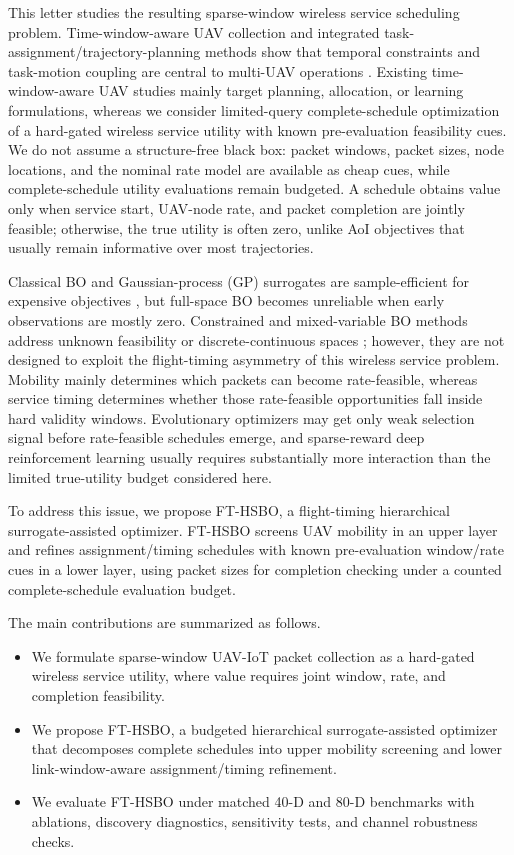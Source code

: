 \documentclass[letterpaper,journal]{IEEEtran}
\begin{document}
This letter studies the resulting sparse-window wireless service scheduling problem. Time-window-aware UAV collection and integrated task-assignment/trajectory-planning methods show that temporal constraints and task-motion coupling are central to multi-UAV operations \cite{say2021,wu2025}. Existing time-window-aware UAV studies mainly target planning, allocation, or learning formulations, whereas we consider limited-query complete-schedule optimization of a hard-gated wireless service utility with known pre-evaluation feasibility cues. We do not assume a structure-free black box: packet windows, packet sizes, node locations, and the nominal rate model are available as cheap cues, while complete-schedule utility evaluations remain budgeted. A schedule obtains value only when service start, UAV-node rate, and packet completion are jointly feasible; otherwise, the true utility is often zero, unlike AoI objectives that usually remain informative over most trajectories.

Classical BO and Gaussian-process (GP) surrogates are sample-efficient for expensive objectives \cite{jones1998,rasmussen2006}, but full-space BO becomes unreliable when early observations are mostly zero. Constrained and mixed-variable BO methods address unknown feasibility or discrete-continuous spaces \cite{gelbart2014,hernandez2016,daulton2022}; however, they are not designed to exploit the flight-timing asymmetry of this wireless service problem. Mobility mainly determines which packets can become rate-feasible, whereas service timing determines whether those rate-feasible opportunities fall inside hard validity windows. Evolutionary optimizers may get only weak selection signal before rate-feasible schedules emerge, and sparse-reward deep reinforcement learning usually requires substantially more interaction \cite{ladosz2022} than the limited true-utility budget considered here.

To address this issue, we propose FT-HSBO, a flight-timing hierarchical surrogate-assisted optimizer. FT-HSBO screens UAV mobility in an upper layer and refines assignment/timing schedules with known pre-evaluation window/rate cues in a lower layer, using packet sizes for completion checking under a counted complete-schedule evaluation budget.

The main contributions are summarized as follows.
\begin{itemize}
    \item We formulate sparse-window UAV-IoT packet collection as a hard-gated wireless service utility, where value requires joint window, rate, and completion feasibility.
    \item We propose FT-HSBO, a budgeted hierarchical surrogate-assisted optimizer that decomposes complete schedules into upper mobility screening and lower link-window-aware assignment/timing refinement.
    \item We evaluate FT-HSBO under matched 40-D and 80-D benchmarks with ablations, discovery diagnostics, sensitivity tests, and channel robustness checks.
\end{itemize}
\end{document}
